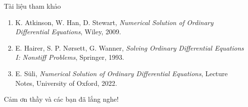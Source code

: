 \documentclass[aspectratio=43]{beamer}
\begin{document}
\begin{frame}{Tài liệu tham khảo}
\small
\begin{enumerate}
  \item K. Atkinson, W. Han, D. Stewart, \textit{Numerical Solution of Ordinary Differential Equations}, Wiley, 2009.
  \item E. Hairer, S. P. Nørsett, G. Wanner, \textit{Solving Ordinary Differential Equations I: Nonstiff Problems}, Springer, 1993.
  \item E. Süli, \textit{Numerical Solution of Ordinary Differential Equations}, Lecture Notes, University of Oxford, 2022.
\end{enumerate}
\vfill
\centering
\Large Cảm ơn thầy và các bạn đã lắng nghe!
\end{frame}
\end{document}
